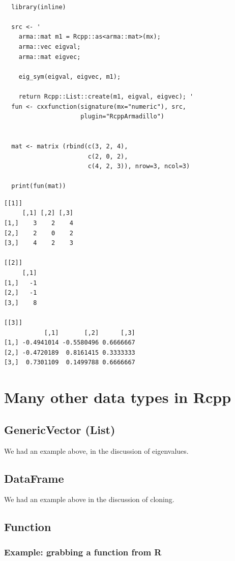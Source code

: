 \documentclass[11pt]{article}
\begin{document}
\begin{verbatim}

  library(inline)
  
  src <- '
    arma::mat m1 = Rcpp::as<arma::mat>(mx);
    arma::vec eigval;
    arma::mat eigvec;

    eig_sym(eigval, eigvec, m1);

    return Rcpp::List::create(m1, eigval, eigvec); '
  fun <- cxxfunction(signature(mx="numeric"), src,
                     plugin="RcppArmadillo")


  mat <- matrix (rbind(c(3, 2, 4),
                       c(2, 0, 2),
                       c(4, 2, 3)), nrow=3, ncol=3)

  print(fun(mat))
\end{verbatim}


\begin{verbatim}
[[1]]
     [,1] [,2] [,3]
[1,]    3    2    4
[2,]    2    0    2
[3,]    4    2    3

[[2]]
     [,1]
[1,]   -1
[2,]   -1
[3,]    8

[[3]]
           [,1]       [,2]      [,3]
[1,] -0.4941014 -0.5580496 0.6666667
[2,] -0.4720189  0.8161415 0.3333333
[3,]  0.7301109  0.1499788 0.6666667
\end{verbatim}
\section{Many other data types in Rcpp}
\label{sec-7}
\subsection{GenericVector (List)}
\label{sec-7-1}


We had an example above, in the discussion of eigenvalues.
\subsection{DataFrame}
\label{sec-7-2}


We had an example above in the discussion of cloning.
\subsection{Function}
\label{sec-7-3}
\subsubsection{Example: grabbing a function from R}
\label{sec-7-3-1}
\end{document}
